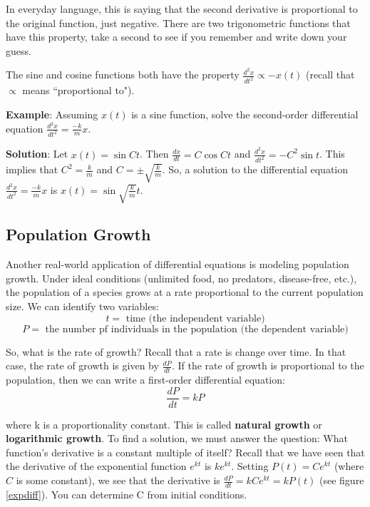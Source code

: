 In everyday language, this is saying that the second derivative is proportional 
to the original function, just negative. There are two trigonometric functions 
that have this property, take a second to see if you remember and write down 
your guess. 

The sine and cosine functions both have the property $\frac{d^2x}{dt^2} \propto 
-x(t)$ (recall that $\propto$ means ``proportional to"). 

\textbf{Example}: Assuming $x(t)$ is a sine function, solve the second-order 
differential equation $\frac{d^2x}{dt^2} = \frac{-k}{m}x$.

\textbf{Solution}: Let $x(t) = \sin{Ct}$. Then $\frac{dx}{dt} = C\cos{Ct}$ and 
$\frac{d^2x}{dt^2} = -C^2\sin{t}$. This implies that $C^2 = \frac{k}{m}$ and 
$C = \pm \sqrt{\frac{k}{m}}$. So, a solution to the differential equation 
$\frac{d^2x}{dt^2} = \frac{-k}{m}x$ is $x(t) = \sin{\sqrt{\frac{k}{m}}t}$. 

\subsection{Population Growth}
Another real-world application of differential equations is modeling population 
growth. Under ideal conditions (unlimited food, no predators, disease-free, 
etc.), the population of a species grows at a rate proportional to the current 
population size. We can identify two variables:
$$t = \text{ time (the independent variable)}$$
$$P = \text{ the number pf individuals in the population (the dependent 
variable)}$$

So, what is the rate of growth? Recall that a rate is change over time. In 
that case, the rate of growth is given by $\frac{dP}{dt}$. If the rate of 
growth is proportional to the population, then we can write a first-order 
differential equation:
$$\frac{dP}{dt} = kP$$

where k is a proportionality constant. This is called \textbf{natural growth} 
or \textbf{logarithmic growth}. 
To find a solution, we must answer the question: What function's derivative is 
a constant multiple of itself? Recall that we have seen that the derivative of 
the exponential function $e^{kt}$ is $ke^{kt}$. Setting $P(t) = Ce^{kt}$ 
(where $C$ is some constant), we see that the derivative is $\frac{dP}{dt} = 
kCe^{kt} = kP(t)$ (see figure \ref{expdiff}). You can determine C from initial 
conditions. 

